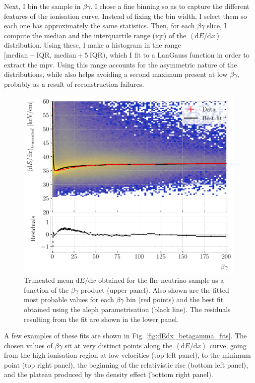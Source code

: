 Next, I bin the sample in $\beta\gamma$. I chose a fine binning so as to capture the different features of the ionisation curve. Instead of fixing the bin width, I select them so each one has approximately the same statistics. Then, for each $\beta\gamma$ slice, I compute the median and the interquartile range (\gls{iqr}) of the $\left<\mathrm{d}E/\mathrm{d}x\right>$ distribution. Using these, I make a histogram in the range $[\mathrm{median}-\mathrm{IQR},~ \mathrm{median}+5~\mathrm{IQR})$, which I fit to a LanGauss function in order to extract the \gls{mpv}. Using this range accounts for the asymmetric nature of the distributions, while also helps avoiding a second maximum present at low $\beta\gamma$, probably as a result of reconstruction failures.

\begin{figure}[t]
	\centering
	\includegraphics[width=.85\linewidth]{Images/GArSoft_PID/dEdx/dEdx_aleph_data_with_fit.pdf}
	\caption[Truncated mean $\mathrm{d}E/\mathrm{d}x$ as a function of the $\beta\gamma$ product, together with the best fit obtained using the \gls{aleph} parametrisation.]{Truncated mean $\mathrm{d}E/\mathrm{d}x$ obtained for the \gls{fhc} neutrino sample as a function of the $\beta\gamma$ product (upper panel). Also shown are the fitted most probable values for each $\beta\gamma$ bin (red points) and the best fit obtained using the \gls{aleph} parametrisation (black line). The residuals resulting from the fit are shown in the lower panel.}
	\label{fig:dEdx_betagamma_aleph}
\end{figure}

A few examples of these fits are shown in Fig. \ref{fig:dEdx_betagamma_fits}. The chosen values of $\beta\gamma$ sit at very distinct points along the $\left<\mathrm{d}E/\mathrm{d}x\right>$ curve, going from the high ionisation region at low velocities (top left panel), to the minimum point (top right panel), the beginning of the relativistic rise (bottom left panel), and the plateau produced by the density effect (bottom right panel).

